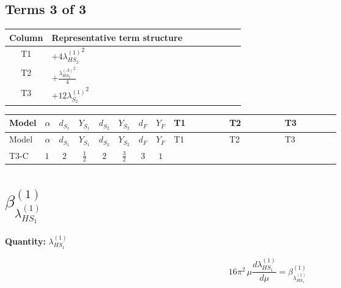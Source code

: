 \documentclass[8pt]{article}
\begin{document}
\begin{landscape}
\subsection*{Terms 3 of 3}
\begin{center}
\begin{tabular}{@{}c >{\raggedright\arraybackslash}p{0.82\linewidth}@{}}
\toprule
Column & Representative term structure \\
\midrule
T1 & \(\displaystyle +4 {\lambda_{HS_2}^{(1)}}^2\) \\
\midrule
T2 & \(\displaystyle +\frac{{\lambda_{HS_2}^{(A)}}^2}{4}\) \\
\midrule
T3 & \(\displaystyle +12 {\lambda_{S_2}^{(1)}}^2\) \\
\midrule
\bottomrule
\end{tabular}
\end{center}
\smallskip
\tiny
\begin{longtable}{@{}llcccccc >{\raggedright\arraybackslash}p{0.21\linewidth} >{\raggedright\arraybackslash}p{0.21\linewidth} >{\raggedright\arraybackslash}p{0.21\linewidth}@{}}
\toprule
Model & $\alpha$ & $d_{S_1}$ & $Y_{S_1}$ & $d_{S_2}$ & $Y_{S_2}$ & $d_F$ & $Y_F$ & T1 & T2 & T3 \\
\midrule
\endfirsthead
\toprule
Model & $\alpha$ & $d_{S_1}$ & $Y_{S_1}$ & $d_{S_2}$ & $Y_{S_2}$ & $d_F$ & $Y_F$ & T1 & T2 & T3 \\
\midrule
\endhead
T3-C & $1$ & $2$ & $\frac{1}{2}$ & $2$ & $\frac{3}{2}$ & $3$ & $1$ & \scriptsize\adjustbox{max width=\linewidth}{$\begin{gathered} +4 {\lambda_{HS_2}^{(1)}}^2\end{gathered}$} & \scriptsize\adjustbox{max width=\linewidth}{$\begin{gathered} +\frac{{\lambda_{HS_2}^{(A)}}^2}{4}\end{gathered}$} & \scriptsize\adjustbox{max width=\linewidth}{$\begin{gathered} +12 {\lambda_{S_2}^{(1)}}^2\end{gathered}$} \\
\midrule
\bottomrule
\end{longtable}
\clearpage
\section*{$\beta_{\lambda_{HS_1}^{(1)}}^{(1)}$}
\noindent\textbf{Quantity: }$\lambda_{HS_1}^{(1)}$\par\smallskip
\[16\pi^2\,\mu\frac{d \lambda_{HS_1}^{(1)}}{d\mu}=\beta_{\lambda_{HS_1}^{(1)}}^{(1)}\]

\end{landscape}
\end{document}
